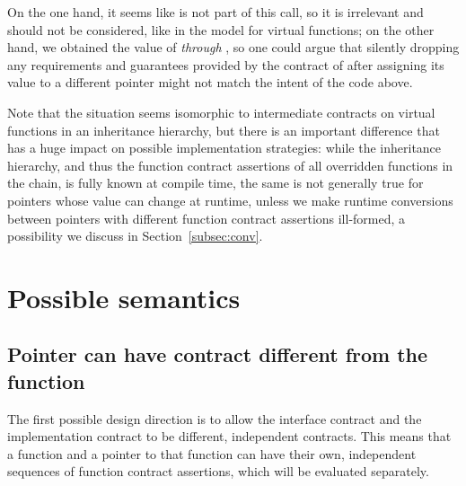 On the one hand, it seems like  is not part of this call, so it is irrelevant and should not be considered, like in the \cite{P3097R0} model for virtual functions; on the other hand, we obtained the value of  \emph{through} , so one could argue that silently dropping any requirements and guarantees provided by the contract of  after assigning its value to a different pointer might not match the intent of the code above.

Note that the situation seems isomorphic to intermediate contracts on virtual functions in an inheritance hierarchy, but there is an important difference that has a huge impact on possible implementation strategies: while the inheritance hierarchy, and thus the function contract assertions of all overridden functions in the chain, is fully known at compile time, the same is not generally true for pointers whose value can change at runtime, unless we make runtime conversions between pointers with different function contract assertions ill-formed, a possibility we discuss in Section~\ref{subsec:conv}.

\section{Possible semantics}
\label{sec:semanics}

\subsection{Pointer can have contract different from the function}
\label{subsec:diffcontract}

The first possible design direction is to allow the interface contract and the implementation contract to be different, independent contracts. This means that a function and a pointer to that function can have their own, independent sequences of function contract assertions, which will be evaluated separately. 

